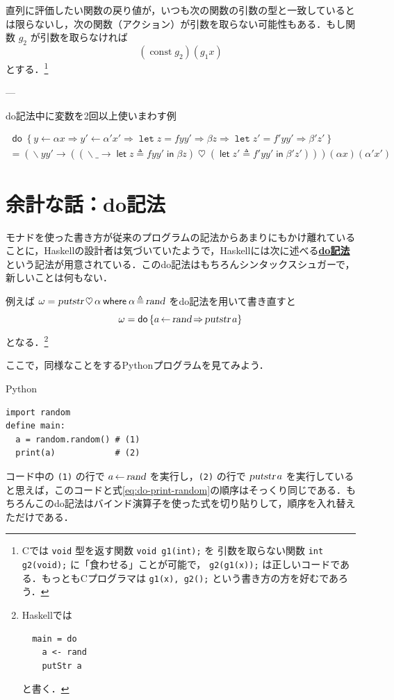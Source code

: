 \documentclass[a4paper,twocolumn]{jsbook}
\newcommand{\programminglanguage}[1]{\textsf{#1}}
\newcommand{\clang}{\programminglanguage{C}}
\newcommand{\haskell}{\programminglanguage{Haskell}}
\newcommand{\python}{\programminglanguage{Python}}
\newcommand{\keyword}[1]{{\underline{\textbf{#1}}}}
\newcommand{\code}[1]{\texttt{#1}}
\newenvironment{pythoncode}{\begin{itembox}[r]{\python}}{\end{itembox}}
\newcommand{\mKeyword}[1]{\mathsf{#1}} %
\newcommand{\mVarKeyword}[1]{\texttt{#1}}
\newcommand{\mDoKeyword}{\mKeyword{do}}
\newcommand{\mDoLetKeyword}{\mVarKeyword{let}}
\newcommand{\mInKeyword}{\mKeyword{in}}
\newcommand{\mLetKeyword}{\mKeyword{let}}
\newcommand{\mWhereKeyword}{\mKeyword{where}}
\DeclareMathOperator{\mDoKW}{\mDoKeyword}
\DeclareMathOperator{\mInKW}{\mInKeyword} %
\DeclareMathOperator{\mLet}{\mLetKeyword} %
\newcommand{\mAnyParam}{\_}
\DeclareMathOperator{\mConst}{const}
\newcommand{\mAction}[1]{\textsl{#1}}
\DeclareMathOperator{\mPutStr}{\mAction{putstr}}
\DeclareMathOperator{\mRand}{\mAction{rand}}
\DeclareMathOperator{\mBind}{\heartsuit}
\DeclareMathOperator{\mDoEq}{\leftarrow}
\DeclareMathOperator{\mDoLetEq}{\mVarKeyword{=}}
\DeclareMathOperator{\mDoNext}{\Rightarrow}%
\DeclareMathOperator{\mLambda}{\backslash}
\DeclareMathOperator{\mLambdaArrow}{\rightarrow}
\DeclareMathOperator{\mLetEq}{\triangleq}
\newcommand{\mDo}[1]{\mDoKW\left\{#1\right\}}
\newcommand{\mDoLet}[2]{\mathop{\mDoLetKeyword}#1\mDoLetEq#2}
\newcommand{\mLambdaExp}[2]{\mLambda{#1}\mLambdaArrow{#2}}
\newcommand{\mLetIn}[3]{\mLet{#1\mLetEq#2}\mInKW{#3}}
\newcommand{\mWhere}[2]{\mathbin{\mWhereKeyword}#1\mLetEq#2}
\begin{document}
直列に評価したい関数の戻り値が，いつも次の関数の引数の型と一致しているとは限らないし，次の関数（アクション）が引数を取らない可能性もある．もし関数 $g_2$ が引数を取らなければ
\begin{equation}
(\mConst g_2)(g_1x)
\end{equation}
とする．\footnote{\clang では \code{void} 型を返す関数 \code{void g1(int);} を 引数を取らない関数 \code{int g2(void);} に「食わせる」ことが可能で， \code{g2(g1(x));} は正しいコードである．もっとも\clang プログラマは \code{g1(x), g2();} という書き方の方を好むであろう．}

---


\begin{table}[tp]
\label{tab:do-alpha-alpha}
\caption{do記法中に変数を2回以上使いまわす例}
\begin{multline*}
\mDo{y\mDoEq\alpha x\mDoNext y'\mDoEq\alpha'x'\mDoNext\mDoLet{z}{fyy'}\mDoNext\beta z\mDoNext\mDoLet{z'}{f'yy'}\mDoNext\beta'z'}\\
=
(\mLambdaExp{yy'}{(
(\mLambdaExp{\mAnyParam}{\mLetIn{z}{fyy'}{\beta z}})
\mBind{}(\mLetIn{z'}{f'yy'}{\beta'z'}))})
(\alpha x)(\alpha'x')
\end{multline*}
\end{table}


\section{余計な話：do記法}

モナドを使った書き方が従来のプログラムの記法からあまりにもかけ離れていることに，\haskell の設計者は気づいていたようで，\haskell には次に述べる\keyword{do記法}という記法が用意されている．このdo記法はもちろんシンタックスシュガーで，新しいことは何もない．

例えば $\omega=\mPutStr\mBind\alpha\mWhere{\alpha}{\mRand}$ をdo記法を用いて書き直すと
\begin{equation}
\label{eq:do-print-random}
\omega=\mDo{a\mDoEq\mRand\mDoNext\mPutStr a}
\end{equation}
となる．\footnote{\haskell では
\begin{verbatim}
  main = do
    a <- rand
    putStr a
\end{verbatim}
と書く．}

ここで，同様なことをする\python プログラムを見てみよう．
\begin{pythoncode}
\begin{verbatim}
import random
define main:
  a = random.random() # (1)
  print(a)            # (2)
\end{verbatim}
\end{pythoncode}
コード中の \code{(1)} の行で $a\mDoEq\mRand$ を実行し，\code{(2)} の行で $\mPutStr a$ を実行していると思えば，このコードと式\eqref{eq:do-print-random}の順序はそっくり同じである．もちろんこのdo記法はバインド演算子を使った式を切り貼りして，順序を入れ替えただけである．
\end{document}
